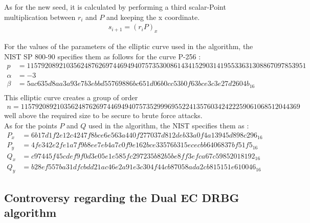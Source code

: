 \noindent
As for the new seed, it is calculated by performing a third scalar-Point multiplication between $r_i$ and $P$ and keeping the x coordinate.
\begin{gather}
    s_{i+1} = {(r_iP)}_x
\end{gather}

For the values of the parameters of the elliptic curve used in the algorithm, the NIST SP 800-90 specifies them as follows for the curve P-256 \cite{nist-sp800-90}:
\begin{align*}
    p &= 115792089210356248762697446949407573530086143415290314195533631308867097853951 \\
    \alpha &= -3 \\
    \beta &= 5ac635d8 aa3a93e7 b3ebbd55 769886bc 651d06b0 cc53b0f6 3bce3c3e 27d2604b_{16} \\
\end{align*}
This elliptic curve creates a group of order 
\begin{gather*}
    n = 115792089210356248762697446949407573529996955224135760342422259061068512044369 \label{eq:order}
\end{gather*} 
well above the required size to be secure to brute force attacks.
\\

\noindent
As for the points $P$ and $Q$ used in the algorithm, the NIST specifies them as \cite{nist-sp800-90}:
\begin{align*}
    P_x &= 6b17d1f2 e12c4247 f8bce6e5 63a440f2 77037d81 2deb33a0 f4a13945 d898c296_{16}\\
    P_y &= 4fe342e2 fe1a7f9b 8ee7eb4a 7c0f9e16 2bce3357 6b315ece cbb64068 37bf51f5_{16}\\
    Q_x &= c97445f4 5cdef9f0 d3e05e1e 585fc297 235b82b5 be8ff3ef ca67c598 52018192_{16}\\
    Q_y &= b28ef557 ba31dfcb dd21ac46 e2a91e3c 304f44cb 87058ada 2cb81515 1e610046_{16}
\end{align*}

\subsection{Controversy regarding the Dual EC DRBG algorithm}

